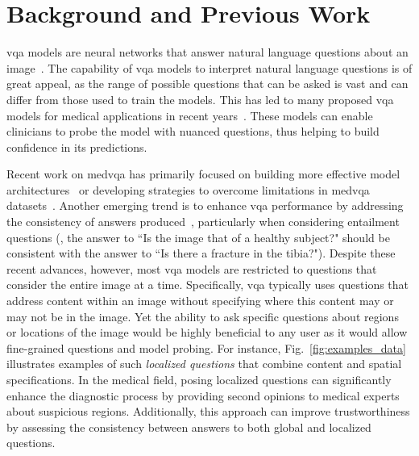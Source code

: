 \section{Background and Previous Work}
\label{sec:locvqa_locatt_background}

\gls{vqa} models are neural networks that answer natural language questions about an image~\cite{antol2015vqa,goyal2017making,hudson2019gqa,tan2019lxmert}. The capability of \gls{vqa} models to interpret natural language questions is of great appeal, as the range of possible questions that can be asked is vast and can differ from those used to train the models. This has led to many proposed \gls{vqa} models for medical applications in recent years~\cite{ImageCLEFVQA_Med2018,liu2019effective,liao2020aiml,vu2020question,zhan2020medical,gong2021cross,yu2023question}. These models can enable clinicians to probe the model with nuanced questions, thus helping to build confidence in its predictions.

Recent work on \gls{medvqa} has primarily focused on building more effective model architectures~\cite{gong2021cross,ren2020cgmvqa,vu2020question} or developing strategies to overcome limitations in \gls{medvqa} datasets~\cite{Nguyen19,liu2021slake,pelka2018radiology,do2021multiple,vu2020question}. Another emerging trend is to enhance \gls{vqa} performance by addressing the consistency of answers produced~\cite{tascon2022consistency}, particularly when considering entailment questions (\ie, the answer to ``Is the image that of a healthy subject?" should be consistent with the answer to ``Is there a fracture in the tibia?"). Despite these recent advances, however, most \gls{vqa} models are restricted to questions that consider the entire image at a time. Specifically, \gls{vqa} typically uses questions that address content within an image without specifying where this content may or may not be in the image. Yet the ability to ask specific questions about regions or locations of the image would be highly beneficial to any user as it would allow fine-grained questions and model probing. For instance, Fig.~\ref{fig:examples_data} illustrates examples of such \emph{localized questions} that combine content and spatial specifications. In the medical field, posing localized questions can significantly enhance the diagnostic process by providing second opinions to medical experts about suspicious regions. Additionally, this approach can improve trustworthiness by assessing the consistency between answers to both global and localized questions.


